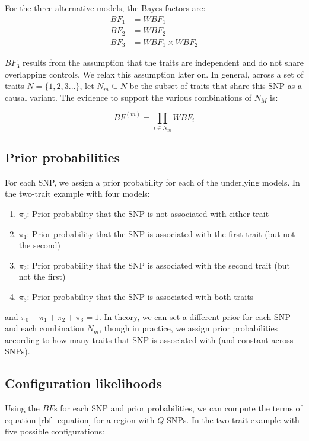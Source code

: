 \documentclass{article}
\begin{document}
\noindent For the three alternative models, the Bayes factors are:
\begin{align}
BF_1 & = WBF_1 \\
BF_2 & = WBF_2 \\
BF_3 & = WBF_1 \times WBF_2
\end{align}

\noindent $BF_3$ results from the assumption that the traits are independent and do not share overlapping controls. We relax this assumption later on. In general, across a set of traits $N = \big\{1,2,3...\big\}$, let $N_m \subseteq N$ be the subset of traits that share this SNP as a causal variant. The evidence to support the various combinations of $N_M$ is:

\begin{equation}
BF^{(m)} = \prod_{i \in N_m} WBF_i
\end{equation}


\subsection{Prior probabilities}
For each SNP, we assign a prior probability for each of the underlying models. In the two-trait example with four models:
\begin{enumerate}[start=0]
  \item $\pi_0$: Prior probability that the SNP is not associated with either trait
  \item $\pi_1$: Prior probability that the SNP is associated with the first trait (but not the second)
  \item $\pi_2$: Prior probability that the SNP is associated with the second trait (but not the first)
  \item $\pi_3$: Prior probability that the SNP is associated with both traits
\end{enumerate}

\noindent and $\pi_0 + \pi_1 + \pi_2 + \pi_3 = 1$. In theory, we can set a different prior for each SNP and each combination $N_m$, though in practice, we assign prior probabilities according to how many traits that SNP is associated with (and constant across SNPs). 

\subsection{Configuration likelihoods}
Using the $BF$s for each SNP and prior probabilities, we can compute the terms of equation \ref{rbf_equation} for a region with $Q$ SNPs. In the two-trait example with five possible configurations:
\end{document}
